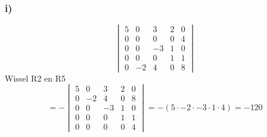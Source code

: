 \documentclass[10pt,a4paper]{article}
\begin{document}
\subsubsection*{i)}
\[
\begin{vmatrix}
5 & 0 & 3 & 2 & 0\\
0 & 0 & 0 & 0 & 4\\
0 & 0 & -3  & 1 & 0\\
0 & 0 & 0 & 1 & 1\\
0 & -2 & 4 &0  &8
\end{vmatrix}
\]
Wissel R2 en R5
\[
=-
\begin{vmatrix}
5 & 0 & 3 & 2 & 0\\
0 & -2 & 4 &0  &8\\
0 & 0 & -3  & 1 & 0\\
0 & 0 & 0 & 1 & 1\\
0 & 0 & 0 & 0 & 4
\end{vmatrix}
= - (5 \cdot -2 \cdot -3 \cdot 1 \cdot 4) = -120
\]
\end{document}
